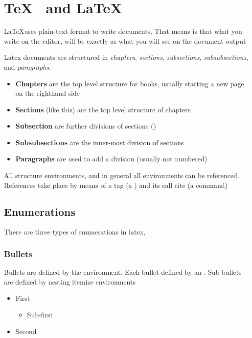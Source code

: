 

\section{\TeX~ and \LaTeX}

\LaTeX uses plain-text format to write documents. That means is that what you write on the editor, will be exactly as what you will see on the document output

Latex documents are structured in \emph{chapters}, \emph{sections}, \emph{subsections}, \emph{subsubsections}, and \emph{paragraphs}.

\begin{itemize}
\item \textbf{Chapters} are the top level structure for books, usually starting a new page on the righthand side
\item \textbf{Sections} (like this) are the top level structure of chapters
\item \textbf{Subsection} are further divisions of sections (\cf {})
\item \textbf{Subsubsections} are the inner-most division of sections
\item \textbf{Paragraphs} are used to add a division (usually not numbered)
\end{itemize}

All structure environments, and in general all environments can be referenced. References take place by means of a tag (\ie a ) and its call cite (\ie a  command)

\subsection{Enumerations}
\label{sec:enums}

There are three types of enumerations in latex, 

\subsubsection{Bullets}

Bullets are defined by the  environment. Each bullet defined by an . Sub-bullets are defined by nesting itemize environments

\begin{itemize}
\item First
\begin{itemize}
\item Sub-first
\end{itemize}
\item Second
\end{itemize}


